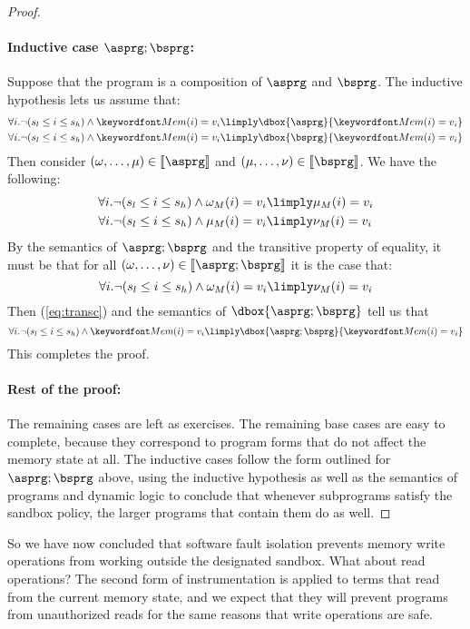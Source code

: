 \documentclass[11pt,twoside]{scrartcl}
\begin{document}
\begin{proof}
\paragraph{Inductive case $\asprg;\bsprg$:}
Suppose that the program is a composition of $\asprg$ and $\bsprg$. The inductive hypothesis lets us assume that:
\begin{align}
\forall i . \lnot(s_l \le i \le s_h)  \land \pderef{i}=v_i &\limply \dbox{\asprg}{\pderef{i}=v_i} \\
\forall i . \lnot(s_l \le i \le s_h)  \land \pderef{i}=v_i &\limply \dbox{\bsprg}{\pderef{i}=v_i}
\end{align}
Then consider $(\omega,\ldots,\mu) \in \llbracket\asprg\rrbracket$ and $(\mu,\ldots,\nu) \in \llbracket\bsprg\rrbracket$. We have the following:
\begin{align}
\label{eq:trans1}
\forall i . \lnot(s_l \le i \le s_h)  \land \omega_M(i)=v_i &\limply \mu_M(i)=v_i \\
\label{eq:trans2}
\forall i . \lnot(s_l \le i \le s_h)  \land \mu_M(i)=v_i &\limply \nu_M(i)=v_i
\end{align}
By the semantics of $\asprg;\bsprg$ and the transitive property of equality, it must be that for all $(\omega,\ldots,\nu)\in\llbracket\asprg;\bsprg\rrbracket$ it is the case that:
\begin{equation}
\label{eq:transc}
\forall i . \lnot(s_l \le i \le s_h)  \land \omega_M(i)=v_i \limply \nu_M(i)=v_i
\end{equation}
Then (\ref{eq:transc}) and the semantics of $\dbox{\asprg;\bsprg}$ tell us that 
\begin{equation}
\forall i . \lnot(s_l \le i \le s_h)  \land \pderef{i}=v_i \limply \dbox{\asprg;\bsprg}{\pderef{i}=v_i}
\end{equation}
This completes the proof.

\paragraph{Rest of the proof:}
The remaining cases are left as exercises. The remaining base cases are easy to complete, because they correspond to program forms that do not affect the memory state at all. The inductive cases follow the form outlined for $\asprg;\bsprg$ above, using the inductive hypothesis as well as the semantics of programs and dynamic logic to conclude that whenever subprograms satisfy the sandbox policy, the larger programs that contain them do as well.
\end{proof}
So we have now concluded that software fault isolation prevents memory write operations from working outside the designated sandbox. What about read operations? The second form of instrumentation is applied to terms that read from the current memory state, and we expect that they will prevent programs from unauthorized reads for the same reasons that write operations are safe.
\end{document}
